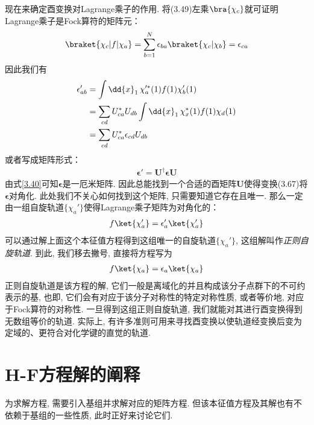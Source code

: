 现在来确定酉变换对Lagrange乘子的作用. 将(3.49)左乘$\bra{\chi_c}$就可证明Lagrange乘子是Fock算符的矩阵元：
\begin{align}
\braket{\chi_c|f|\chi_a} = \sum_{b=1}^{N}\epsilon_{ba}\braket{\chi_c|\chi_b} = \epsilon_{ca}
\end{align}
因此我们有
\begin{align}
\epsilon_{ab}' & = \int\dd{x}_1\,\chi_a^{\prime *}(1)f(1)\chi_b'(1)\notag\\
               & = \sum_{cd}U_{ca}^* U_{db}\int\dd{x}_1\,\chi_x^*(1)f(1)\chi_d(1)\notag\\
               & = \sum_{cd}U_{ca}^* \epsilon_{cd} U_{db}
\end{align}
或者写成矩阵形式：
\begin{align}
\bm{\epsilon}' = \mathbf{U}^\dagger \bm{\epsilon}\mathbf{U}
\end{align}
由式\eqref{3.40}可知$\bm{\epsilon}$是一厄米矩阵. 因此总能找到一个合适的酉矩阵$\mathbf{U}$使得变换(3.67)将$\bm{\epsilon}$对角化. 此处我们不关心如何找到这个矩阵, 只需要知道它存在且唯一. 那么一定由一组自旋轨道$\{\chi_a'\}$使得Lagrange乘子矩阵为对角化的：
\begin{align}
f\ket{\chi_a'} = \epsilon_a'\ket{\chi_a'}
\end{align}
可以通过解上面这个本征值方程得到这组唯一的自旋轨道$\{\chi_a'\}$, 这组解叫作\emph{正则自旋轨道}. 到此, 我们移去撇号, 直接将\hft 方程写为
\begin{align}
f\ket{\chi_a} = \epsilon_a\ket{\chi_a}
\end{align}
正则自旋轨道是该方程的解, 它们一般是离域化的并且构成该分子点群下的不可约表示的基, 也即, 它们会有对应于该分子对称性的特定对称性质, 或者等价地, 对应于Fock算符的对称性. 一旦得到这组正则自旋轨道, 我们就能对其进行酉变换得到无数组等价的轨道. 实际上, 有许多准则可用来寻找酉变换以使轨道经变换后变为定域的、更符合对化学键的直觉的轨道.
\section{H-F方程解的阐释}
为求解\hft 方程, 需要引入基组并求解对应的矩阵方程. 但该本征值方程及其解也有不依赖于基组的一些性质, 此时正好来讨论它们.
